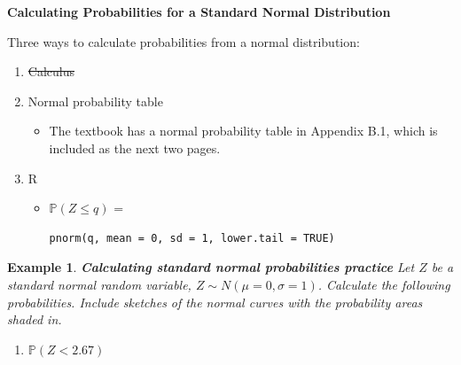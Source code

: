 \documentclass[12pt]{amsart}
\newtheorem{example}[theorem]{Example}
\newcommand{\m}{\mu}
\newcommand{\s}{\sigma}
\newcommand{\bP}{\mathbb{P}}
\begin{document}
{\newpage


\textbf{Calculating Probabilities for a Standard Normal Distribution} \newline

Three ways to calculate probabilities from a normal distribution:

\begin{enumerate}
\item \sout{Calculus}
\item Normal probability table
	\begin{itemize}
	\item The textbook has a normal probability table in Appendix B.1, which is included as the next two pages.
	\end{itemize}
\item R
	\begin{itemize}
	\item $\bP(Z\leq q)$ = \begin{verbatim}pnorm(q, mean = 0, sd = 1, lower.tail = TRUE)\end{verbatim}
	\end{itemize}	
\end{enumerate}

\vspace{.5cm}






\begin{example}  \textbf{Calculating standard normal probabilities practice} \newline
Let $Z$ be a standard normal random variable, $Z\sim N(\m=0,\s=1)$.\newline
Calculate the following probabilities. Include sketches of the normal curves with the probability areas shaded in.

\begin{enumerate}
\item $\bP( Z < 2.67 ) $

\vfill


\end{enumerate}
\end{example}}
\end{document}
